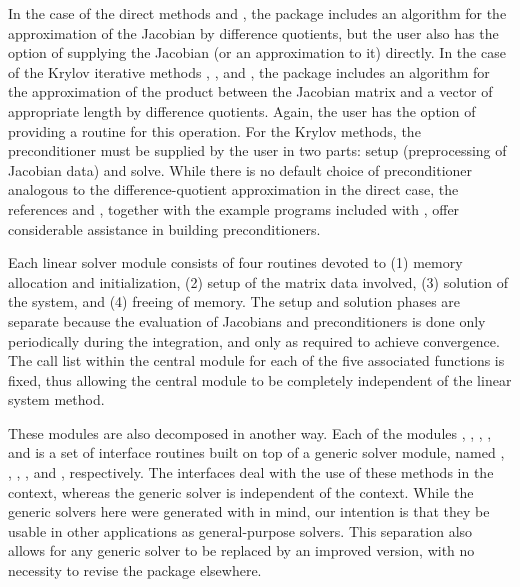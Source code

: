In the case of the direct methods {\cvdense} and {\cvband}, the package includes
an algorithm for the approximation of the Jacobian by difference
quotients, but the user also has the option of supplying the Jacobian
(or an approximation to it) directly.  In the case of the Krylov iterative
methods {\cvspgmr}, {\cvspbcg}, and {\cvsptfqmr}, the package includes an algorithm
for the approximation of the product between the Jacobian matrix and a vector of
appropriate length by difference quotients. Again, the user has the option of
providing a routine for this operation.
For the Krylov methods, 
the preconditioner must be supplied by the user in two parts: 
setup (preprocessing of Jacobian data) and solve.
While there is no default choice of
preconditioner analogous to the difference-quotient approximation
in the direct case, the references \cite{BrHi:89} and \cite{Byr:92},
together with the example programs included with {\cvodes}, offer
considerable assistance in building preconditioners.

Each {\cvodes} linear solver module consists of four routines devoted to (1)
memory allocation and initialization, (2) setup of the matrix data
involved, (3) solution of the system, and (4) freeing of memory.  
The setup and solution phases are separate because the evaluation of
Jacobians and preconditioners is done only periodically during the
integration, and only as required to achieve convergence. The call list within
the central {\cvodes} module for each of the five associated functions is
fixed, thus allowing the central module to be completely independent
of the linear system method.

These modules are also decomposed in another way.
Each of the modules {\cvdense}, {\cvband}, {\cvspgmr}, {\cvspbcg}, and
{\cvsptfqmr} is a set of interface routines built on top of a generic solver
module, named {\dense}, {\band}, {\spgmr}, {\spbcg}, and {\sptfqmr}, respectively.
The interfaces deal with the use of these methods in the {\cvodes} context, 
whereas the generic solver is independent of the context.
While the generic solvers here were generated with {\sundials} in mind, our
intention is that they be usable in other applications as
general-purpose solvers.  This separation also allows for any generic
solver to be replaced by an improved version, with no necessity to
revise the {\cvodes} package elsewhere.

